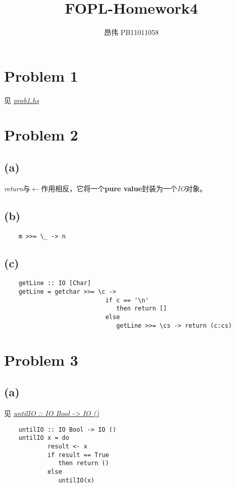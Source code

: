 \documentclass{paper}
\title{FOPL-Homework4}
\author{昂伟 PB11011058}
\begin{document}
\maketitle

\section*{Problem 1}
见{} \href{prob1.hs}{\textit{prob1.hs}}

\section*{Problem 2}
	\subsection*{(a)}
		\textit{return}与$\leftarrow$作用相反，它将一个\textbf{pure value}封装为一个\textit{IO}对象。
	
	\subsection*{(b)}
	\begin{lstlisting}
	m >>= \_ -> n
	\end{lstlisting}
	
	\subsection*{(c)}
	\begin{lstlisting}
	getLine :: IO [Char]
	getLine = getchar >>= \c -> 
                            if c == '\n'
                               then return []
                            else 
                               getLine >>= \cs -> return (c:cs)
	\end{lstlisting}
	
\section*{Problem 3}
	\subsection*{(a)}
	见{} \href{./Guesser.hs}{\textit{untilIO :: IO Bool -> IO ()}}
	\begin{lstlisting}
	untilIO :: IO Bool -> IO ()
	untilIO x = do 
	        result <- x
	        if result == True
		       then return ()
	        else 
		       untilIO(x)
	\end{lstlisting}
	
\end{document}
